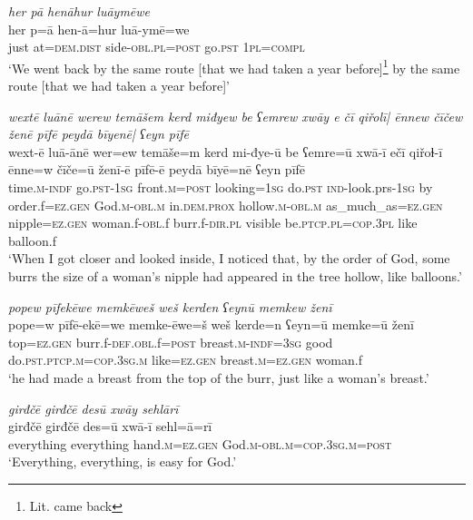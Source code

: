\ea \label{ZQ.34}
\textit{her pā henāhur luāymēwe} \\ 
\gll her p=ā hen-ā=hur luā-ymē=we \\ 
 just at=\textsc{dem.dist} side\textsc{-obl}\textsc{.pl}\textsc{=\textsc{post}} go\textsc{.pst} \textsc{1pl}\textsc{=compl} \\ 
\glt `We went back by the same route [that we had taken a year before]\footnote{Lit. came back} by the same route [that we had taken a year before]'
\z 
 
\ea \label{ZQ.39}
\textit{wextē luānē werew temāšem kerd miđyew be ʕemrew xwāy e čī qiřolī| ēnnew čīčew ženē pīfē peydā bīyenē| ʕeyn pīfē} \\ 
\gll wext-ē luā-ānē wer=ew temāše=m kerd mi-đye-ū be ʕemre=ū xwā-ī ečī qiřoɫ-ī ēnne=w čīče=ū ženī-ē pīfē-ē peydā bīyē=nē ʕeyn pīfē \\ 
 time\textsc{.m}\textsc{-indf} go\textsc{.pst}\textsc{-\textsc{1sg}} front\textsc{.m}\textsc{=\textsc{post}} looking\textsc{=\textsc{1sg}} do\textsc{.pst} \textsc{ind-}look.prs\textsc{-\textsc{1sg}} by order.f\textsc{=ez.gen} God\textsc{.m}\textsc{-obl}\textsc{.m} in.\textsc{dem.prox} hollow\textsc{.m}\textsc{-obl}\textsc{.m} as\_much\_as\textsc{=ez.gen} nipple\textsc{=ez.gen} woman.f\textsc{-obl}.f burr.f\textsc{-dir}\textsc{.pl} visible be\textsc{.ptcp}\textsc{.pl}\textsc{=cop}\textsc{.3pl} like balloon.f \\ 
\glt `When I got closer and looked inside, I noticed that, by the order of God, some burrs the size of a woman's nipple had appeared in the tree hollow, like balloons.'
\z 
 
\ea \label{ZQ.43}
\textit{popew pīfekēwe memkēweš weš kerden ʕeynū memkew ženī} \\ 
\gll pope=w pīfē-ekē=we memke-ēwe=š weš kerde=n ʕeyn=ū memke=ū ženī \\ 
 top\textsc{=ez.gen} burr.f\textsc{-def}\textsc{.obl}.f\textsc{=\textsc{post}} breast\textsc{.m}\textsc{-indf}\textsc{=3sg} good do\textsc{.pst}\textsc{.ptcp}\textsc{.m}\textsc{=cop}\textsc{.3sg}\textsc{.m} like\textsc{=ez.gen} breast\textsc{.m}\textsc{=ez.gen} woman.f \\ 
\glt `he had made a breast from the top of the burr, just like a woman’s breast.'
\z 
 
\ea \label{ZQ.56}
\textit{girđčē girđčē desū xwāy sehlārī} \\ 
\gll girđčē girđčē des=ū xwā-ī sehl=ā=rī \\ 
 everything everything hand\textsc{.m}\textsc{=ez.gen} God\textsc{.m}\textsc{-obl}\textsc{.m}\textsc{=cop}\textsc{.3sg}\textsc{.m}\textsc{=\textsc{post}} \\ 
\glt `Everything, everything, is easy for God.'
\z 
 

